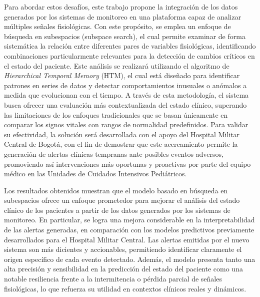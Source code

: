 Para abordar estos desafíos, este trabajo propone la integración de los datos generados por los sistemas de monitoreo en una plataforma capaz de analizar múltiples señales fisiológicas. Con este propósito, se emplea un enfoque de búsqueda en subespacios (subspace search), el cual permite examinar de forma sistemática la relación entre diferentes pares de variables fisiológicas, identificando combinaciones particularmente relevantes para la detección de cambios críticos en el estado del paciente. Este análisis se realizará utilizando el algoritmo de \textit{Hierarchical Temporal Memory} (HTM), el cual está diseñado para identificar patrones en series de datos y detectar comportamientos inusuales o anómalos a medida que evolucionan con el tiempo. A través de esta metodología, el sistema busca ofrecer una evaluación más contextualizada del estado clínico, superando las limitaciones de los enfoques tradicionales que se basan únicamente en comparar los signos vitales con rangos de normalidad predefinidos. Para validar su efectividad, la solución será desarrollada con el apoyo del Hospital Militar Central de Bogotá, con el fin de demostrar que este acercamiento permite la generación de alertas clínicas tempranas ante posibles eventos adversos, promoviendo así intervenciones más oportunas y proactivas por parte del equipo médico en las Unidades de Cuidados Intensivos Pediátricos.

Los resultados obtenidos muestran que el modelo basado en búsqueda en subespacios ofrece un enfoque prometedor para mejorar el análisis del estado clínico de los pacientes a partir de los datos generados por los sistemas de monitoreo. En particular, se logra una mejora considerable en la interpretabilidad de las alertas generadas, en comparación con los modelos predictivos previamente desarrollados para el Hospital Militar Central. Las alertas emitidas por el nuevo sistema son más dicientes y accionables, permitiendo identificar claramente el origen específico de cada evento detectado. Además, el modelo presenta tanto una alta precisión y sensibilidad en la predicción del estado del paciente como una notable resiliencia frente a la intermitencia o pérdida parcial de señales fisiológicas, lo que refuerza su utilidad en contextos clínicos reales y dinámicos.